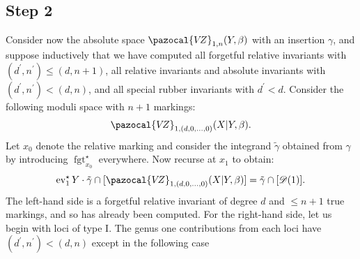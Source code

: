 \documentclass[11pt]{amsart}
\newcommand{\sqC}{\scalebox{0.8}[1.3]{$\sqsubset$}}
\newcommand{\VZ}{\pazocal{V\!Z}}
\newcommand{\st}{\star}
\newcommand{\ev}{\operatorname{ev}}
\newcommand{\fgt}{\operatorname{fgt}}
\newcommand{\Dcal}{\mathcal{D}}
\theoremstyle{definition}
\theoremstyle{definition}
\begin{document}
\subsection*{Step 2} Consider now the absolute space $\VZ_{1,n}(Y,\beta)$ with an insertion $\gamma$, and suppose inductively that we have computed all forgetful relative invariants with $(d^\prime,n^\prime) \leq (d,n+1)$, all relative invariants and absolute invariants with $(d^\prime,n^\prime) < (d,n)$, and all special rubber invariants with $d^\prime < d$. Consider the following moduli space with $n+1$ markings:
\begin{equation*} \VZ_{1,(d,0,\ldots,0)}(X|Y,\beta). \end{equation*}
Let $x_0$ denote the relative marking and consider the integrand $\tilde\gamma$ obtained from $\gamma$ by introducing $\fgt^\st_{x_0}$ everywhere. Now recurse at $x_1$ to obtain:
\begin{equation}\label{step 2 recursion} \ev_1^\st Y \cdot \tilde\gamma \cap [\VZ_{1,(d,0,\ldots,0)}(X|Y,\beta)] = \tilde\gamma\cap[\Dcal(1)].\end{equation}
The left-hand side is a forgetful relative invariant of degree $d$ and $\leq n+1$ true markings, and so has already been computed. For the right-hand side, let us begin with loci of type I. The genus one contributions from each loci have $(d^\prime,n^\prime) < (d,n)$ except in the following case
\begin{center}
\end{center}
\end{document}
